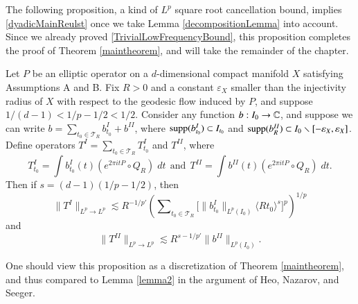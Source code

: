 The following proposition, a kind of $L^p$ square root cancellation bound, implies \eqref{dyadicMainReulst} once we take Lemma \ref{decompositionLemma} into account. %
Since we already proved \eqref{TrivialLowFrequencyBound}, this proposition completes the proof of Theorem \ref{maintheorem}, and will take the remainder of the chapter.

\begin{prop} \label{TjbLemma}
    Let $P$ be an elliptic operator on a $d$-dimensional compact manifold $X$ satisfying Assumptions A and B. Fix $R > 0$ and a constant $\varepsilon_X$ smaller than the injectivity radius of $X$ with respect to the geodesic flow induced by $P$, and suppose $1/(d-1) < 1/p - 1/2 < 1/2$. Consider any function $b: I_0 \to \operatorname{\mathbb{C}}$, and suppose we can write $b = \sum\nolimits_{t_0 \in \mathcal{T}_R} b_{t_0}^I + b^{II}$, where $\operatorname{\text{supp}}(b_{t_0}^I) \subset I_{t_0}$ and $\operatorname{\text{supp}}(b_R^{II}) \subset I_0 \smallsetminus [-\varepsilon_X,\varepsilon_X]$. Define operators $T^I = \sum\nolimits_{t_0 \in \mathcal{T}_R} T^I_{t_0}$ and $T^{II}$, where
    \[ T_{t_0}^I = \int b_{t_0}^I(t) ( e^{2 \pi i tP} \circ Q_R )\; dt\ \ \text{and}\ \ T^{II} = \int b^{II}(t) ( e^{2 \pi i tP} \circ Q_R)\; dt. \]
    Then if $s = (d-1)(1/p - 1/2)$, then
    \begin{equation} \label{ejqwoifjeoifjwqoifjwqoi}
        \| T^I \|_{L^p \to L^p} \lesssim R^{-1/p'} \left( \sum\nolimits_{t_0 \in \mathcal{T}_R} \Big[ \| b^I_{t_0} \|_{L^p(I_0)} \langle R t_0 \rangle^{s} \Big]^{p} \right)^{1/p}
    \end{equation}
    and
    \begin{equation} \label{DPOIJAOIWDJQWIOFJQOIVJIEOVNFNJNVNV}
        \| T^{II} \|_{L^p \to L^p} \lesssim R^{s - 1/p'} \| b^{II} \|_{L^p(I_0)}.
    \end{equation}
\end{prop}

\begin{remark}
    One should view this proposition as a discretization of Theorem \ref{maintheorem}, and thus compared to Lemma \ref{lemma2} in the argument of Heo, Nazarov, and Seeger.
\end{remark}

